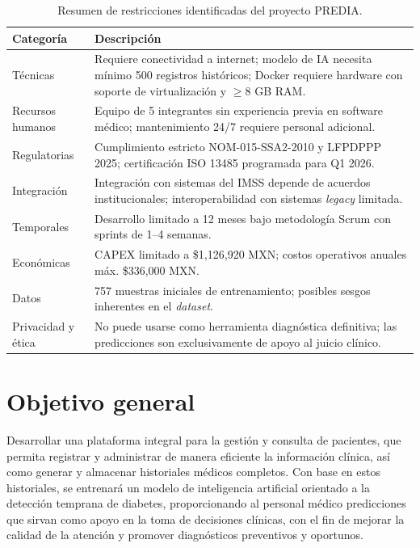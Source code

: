 \documentclass[12pt, letterpaper, twoside]{report}
\newcommand{\thead}[1]{\textbf{\sffamily #1}}
\newcommand{\trow}{}
\begin{document}
\begin{table}[H]
  \centering
  \caption{Resumen de restricciones identificadas del proyecto PREDIA.}
  \label{tab:restricciones}
  \begin{tabularx}{\linewidth}{l X}
    \toprule
    \thead{Categoría} & \thead{Descripción} \\
    \midrule
    \trow Técnicas & Requiere conectividad a internet; modelo de IA necesita mínimo 500 registros históricos; Docker requiere hardware con soporte de virtualización y $\geq$8 GB RAM. \\
    Recursos humanos & Equipo de 5 integrantes sin experiencia previa en software médico; mantenimiento 24/7 requiere personal adicional. \\
    \trow Regulatorias & Cumplimiento estricto NOM-015-SSA2-2010 y LFPDPPP 2025; certificación ISO 13485 programada para Q1 2026. \\
    Integración & Integración con sistemas del IMSS depende de acuerdos institucionales; interoperabilidad con sistemas \textit{legacy} limitada. \\
    \trow Temporales & Desarrollo limitado a 12 meses bajo metodología Scrum con sprints de 1--4 semanas. \\
    Económicas & CAPEX limitado a \$1{,}126{,}920 MXN; costos operativos anuales máx. \$336{,}000 MXN. \\
    \trow Datos & 757 muestras iniciales de entrenamiento; posibles sesgos inherentes en el \textit{dataset}. \\
    Privacidad y ética & No puede usarse como herramienta diagnóstica definitiva; las predicciones son exclusivamente de apoyo al juicio clínico. \\
    \bottomrule
  \end{tabularx}
\end{table}

\section{Objetivo general}

Desarrollar una plataforma integral para la gestión y consulta de pacientes, que permita registrar y administrar de manera eficiente la información clínica, así como generar y almacenar historiales médicos completos. Con base en estos historiales, se entrenará un modelo de inteligencia artificial orientado a la detección temprana de diabetes, proporcionando al personal médico predicciones que sirvan como apoyo en la toma de decisiones clínicas, con el fin de mejorar la calidad de la atención y promover diagnósticos preventivos y oportunos.
\end{document}
